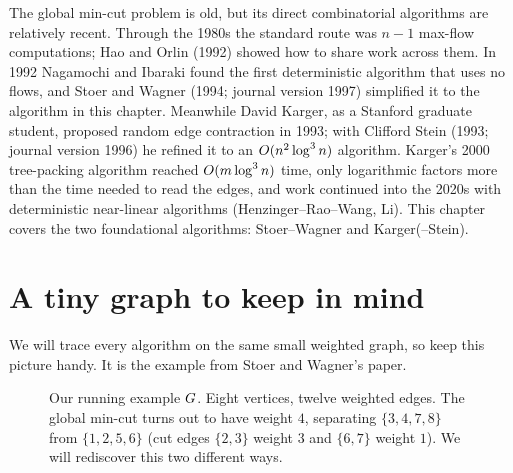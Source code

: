 \begin{historybox}
The global min-cut problem is old, but its direct combinatorial algorithms are relatively recent. Through the 1980s the standard route was $n-1$ max-flow computations; Hao and Orlin (1992) showed how to share work across them. In 1992 Nagamochi and Ibaraki found the first deterministic algorithm that uses no flows, and Stoer and Wagner (1994; journal version 1997) simplified it to the algorithm in this chapter. Meanwhile David Karger, as a Stanford graduate student, proposed random edge contraction in 1993; with Clifford Stein (1993; journal version 1996) he refined it to an $O(n^2\log^3 n)$ algorithm. Karger's 2000 tree-packing algorithm reached $O(m\log^3 n)$ time, only logarithmic factors more than the time needed to read the edges, and work continued into the 2020s with deterministic near-linear algorithms (Henzinger--Rao--Wang, Li). This chapter covers the two foundational algorithms: Stoer--Wagner and Karger(--Stein).
\end{historybox}

\section{A tiny graph to keep in mind}

We will trace every algorithm on the same small weighted graph, so keep this picture handy. It is the example from Stoer and Wagner's paper.

\begin{figure}[H]
\centering
{}
\caption{Our running example $G$. Eight vertices, twelve weighted edges. The global min-cut turns out to have weight $4$, separating $\{3,4,7,8\}$ from $\{1,2,5,6\}$ (cut edges $\{2,3\}$ weight $3$ and $\{6,7\}$ weight $1$). We will rediscover this two different ways.}
\label{ch11:fig-running}
\end{figure}

